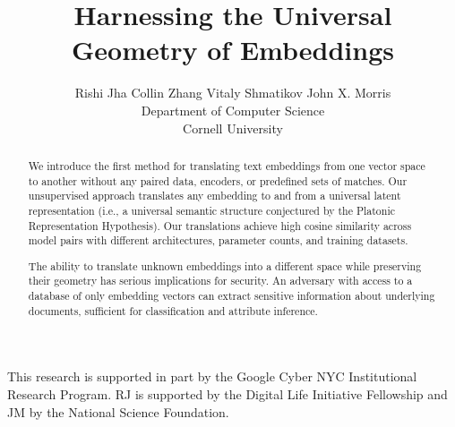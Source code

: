 \documentclass{article}
\title{Harnessing the Universal Geometry of Embeddings}
\author{%
  Rishi Jha \quad Collin Zhang \quad Vitaly Shmatikov \quad John X. Morris\\
  Department of Computer Science\\
  Cornell University
}
\begin{document}
\maketitle

\begin{abstract}
We introduce the first method for translating text embeddings from one vector space to another without any paired data, encoders, or predefined sets of matches.  Our unsupervised approach translates any embedding to and from a universal latent representation (i.e., a universal semantic structure conjectured by the Platonic Representation Hypothesis).  Our translations achieve high cosine similarity across model pairs with different architectures, parameter counts, and training datasets.

The ability to translate unknown embeddings into a different space while preserving their geometry has serious implications for security.  An adversary with access to a database of only embedding vectors can extract sensitive information about underlying documents, sufficient for classification and attribute inference.

\end{abstract}









% 

\begin{ack}

This research is supported in part by the Google Cyber NYC Institutional Research Program. RJ is supported by the Digital Life Initiative Fellowship and JM by the National Science Foundation.


\end{ack}

%     
%     
\printbibliography


\newpage
\appendix



% 
\end{document}
